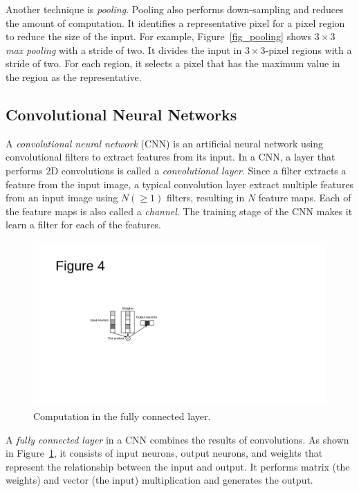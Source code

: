 Another technique is \textit{pooling}. Pooling also performs down-sampling and reduces the amount of computation. It identifies a representative pixel for a pixel region to reduce the size of the input. For example, Figure~\ref{fig_pooling} shows $3 \times 3$ \textit{max pooling} with a stride of two. It divides the input in $3 \times 3$-pixel regions with a stride of two. For each region, it selects a pixel that has the maximum value in the region as the representative. 

\subsection{Convolutional Neural Networks}
\label{sec:CNN}
A \textit{convolutional neural network} (CNN) is an artificial neural network using convolutional filters to extract features from its input. In a CNN, a layer that performs 2D convolutions is called a \textit{convolutional layer}. Since a filter extracts a feature from the input image, a typical convolution layer extract multiple features from an input image using $N (\geq 1)$ filters, resulting in $N$ feature maps. Each of the feature maps is also called a \textit{channel}. The training stage of the CNN makes it learn a filter for each of the features.

\begin{figure}[htbp]
  \centering
  \includegraphics[width=0.5\linewidth]{./figures/fully}
  \caption{Computation in the fully connected layer. }
  \label{fig_fully}
\end{figure}

A \textit{fully connected layer} in a CNN combines the results of convolutions. As shown in Figure~\ref{fig_fully}, it consists of input neurons, output neurons, and weights that represent the relationship between the input and output. It performs matrix (the weights) and vector (the input) multiplication and generates the output.

